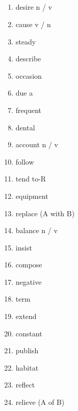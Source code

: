 \documentclass[10pt, a4paper, landscape]{oblivoir}
\begin{document}
\begin{multicols}{3}
    \section{}
    \begin{enumerate}
        \item desire n / v
        \item cause v / n
        \item steady 
        \item describe 
        \item occasion 
        \item due a
        \item frequent 
        \item dental 
        \item account n / v
        \item follow 
        \item tend to-R
        \item equipment 
        \item replace (A with B)
        \item balance n / v
        \item insist 
        \item compose 
        \item negative 
        \item term 
        \item extend 
        \item constant
        \item publish 
        \item habitat 
        \item reflect 
        \item relieve (A of B)


    \end{enumerate}


\end{multicols}
\end{document}

